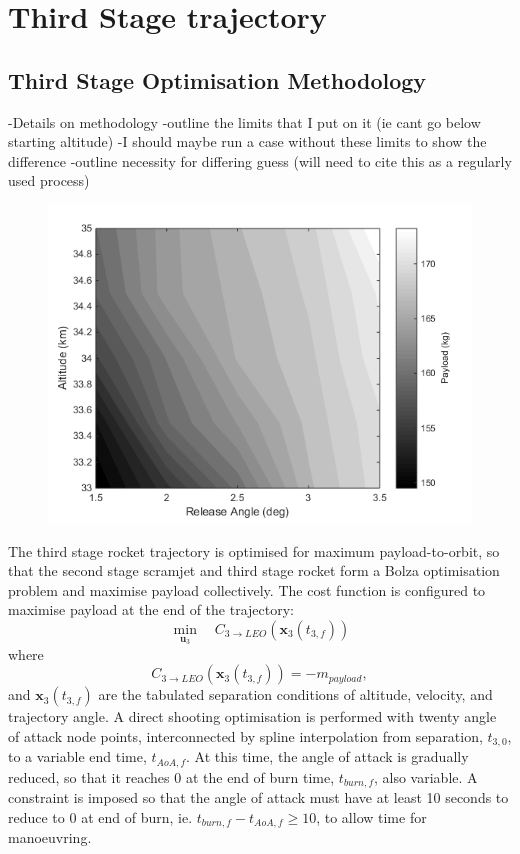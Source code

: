 \section{Third Stage trajectory}

\subsection{Third Stage Optimisation Methodology}
-Details on methodology
-outline the limits that I put on it (ie cant go below starting altitude)
-I should maybe run a case without these limits to show the difference
-outline necessity for differing guess (will need to cite this as a regularly used process)

\begin{figure}[h]
\centering
\includegraphics[width=0.7\linewidth]{figures/5_Ascent/contours}
\caption{}
\label{fig:contours}
\end{figure}


The third stage rocket trajectory is optimised for maximum payload-to-orbit, so that the second stage scramjet and third stage rocket form a Bolza optimisation problem and maximise payload collectively. The cost function is configured to maximise payload at the end of the trajectory:
\begin{equation} 
\min\limits_{\textbf{u}_3} \quad C_{3\rightarrow LEO}(\textbf{x}_{3}(t_{3,f})) 
\end{equation}
where
\begin{equation}
C_{3\rightarrow LEO}(\textbf{x}_{3}(t_{3,f})) = -m_{payload},
\end{equation}
and $\textbf{x}_{3}(t_{3,f})$ are the tabulated separation conditions of altitude, velocity, and trajectory angle. A direct shooting optimisation is performed with twenty angle of attack node points, interconnected by spline interpolation from separation, $t_{3,0}$, to a variable end time, $t_{AoA,f}$. At this time, the angle of attack is gradually reduced, so that it reaches 0 at the end of burn time, $t_{burn,f}$, also variable.  A constraint is imposed so that the angle of attack must have at least 10 seconds to reduce to 0 at end of burn, ie. $t_{burn,f} - t_{AoA,f} \ge 10$, to allow time for manoeuvring.



